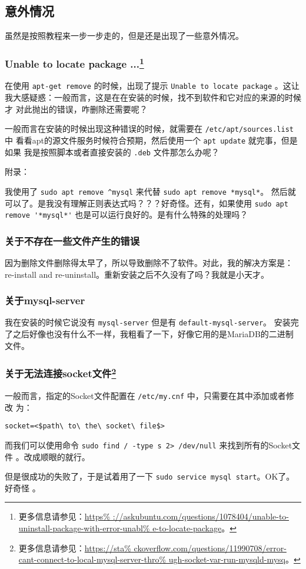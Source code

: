 \subsection{意外情况}

虽然是按照教程来一步一步走的，但是还是出现了一些意外情况。

\subsubsection[Unable to locate package ...]
              {Unable to locate package ...\footnote{更多信息请参见：\url{https%
://askubuntu.com/questions/1078404/unable-to-uninstall-package-with-error-unabl%
e-to-locate-package}。}}

在使用 \verb|apt-get remove| 的时候，出现了提示 \verb|Unable to locate package|%
。这让我大感疑惑：一般而言，这是在在安装的时候，找不到软件和它对应的来源的时候才
对此抛出的错误，咋删除还需要呢？

一般而言在安装的时候出现这种错误的时候，就需要在 \verb|/etc/apt/sources.list| 中
看看apt的源文件服务时候符合预期，然后使用一个 \verb|apt update| 就完事，但是如果
我是按照脚本或者直接安装的 \verb|.deb| 文件那怎么办呢？

\smallskip
附录：

我使用了 \verb|sudo apt remove ^mysql| 来代替 \verb|sudo apt remove *mysql*|。
然后就可以了。是我没有理解正则表达式吗？？？好奇怪。还有，如果使用 
\verb|sudo apt remove '*mysql*'| 也是可以运行良好的。是有什么特殊的处理吗？

\subsubsection{关于不存在一些文件产生的错误}

因为删除文件删除得太早了，所以导致删除不了软件。对此，我的解决方案是：re-install
and re-uninstall。重新安装之后不久没有了吗？我就是小天才。

\subsubsection{关于mysql-server}

我在安装的时候它说没有 \verb|mysql-server| 但是有 \verb|default-mysql-server|。
安装完了之后好像也没有什么不一样，我粗看了一下，好像它用的是MariaDB的二进制文件。

\subsubsection[关于无法连接socket文件]%
              {关于无法连接socket文件\footnote{更多信息请参见：\url{https://sta%
ckoverflow.com/questions/11990708/error-cant-connect-to-local-mysql-server-thro%
ugh-socket-var-run-mysqld-mysq}。}}

一般而言，指定的Socket文件配置在 \verb|/etc/my.cnf| 中，只需要在其中添加或者修改
为：
\begin{lstlisting}
socket=<$path\ to\ the\ socket\ file$>
\end{lstlisting}

而我们可以使用命令 \verb|sudo find / -type s 2> /dev/null| 来找到所有的Socket文件
。改成顺眼的就行。

但是很成功的失败了，于是试着用了一下 \verb|sudo service mysql start|。OK了。好奇怪
。

